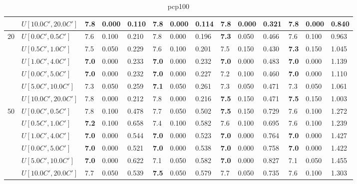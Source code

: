\begin{table}[h]
{\begin{tabular}{|l|l||l|l|l||l|l|l||l|l|l||l|l|l|}
       & $U[10.0C',20.0C']$ & \textbf{7.8} & 0.000 & 0.110 & \textbf{7.8} & 0.000 & 0.114 & \textbf{7.8} & 0.000 & 0.321 & \textbf{7.8} & 0.000 & 0.840 \\
      \hline\hline
      \multirow{6}{*}{20} & $U[0.0C',0.5C']$ & 7.6 & 0.100 & 0.210 & 7.8 & 0.000 & 0.196 & \textbf{7.3} & 0.050 & 0.466 & 7.6 & 0.100 & 0.963 \\
       & $U[0.5C',1.0C']$ & 7.5 & 0.050 & 0.229 & 7.6 & 0.100 & 0.201 & 7.5 & 0.150 & 0.430 & \textbf{7.3} & 0.150 & 1.045 \\
       & $U[1.0C',4.0C']$ & \textbf{7.0} & 0.000 & 0.233 & \textbf{7.0} & 0.000 & 0.232 & \textbf{7.0} & 0.000 & 0.483 & \textbf{7.0} & 0.000 & 1.139 \\
       & $U[0.0C',5.0C']$ & \textbf{7.0} & 0.000 & 0.232 & \textbf{7.0} & 0.000 & 0.227 & 7.2 & 0.100 & 0.460 & \textbf{7.0} & 0.000 & 1.110 \\
       & $U[5.0C',10.0C']$ & 7.3 & 0.050 & 0.259 & \textbf{7.1} & 0.050 & 0.261 & 7.3 & 0.050 & 0.471 & 7.3 & 0.050 & 1.061 \\
       & $U[10.0C',20.0C']$ & 7.8 & 0.000 & 0.212 & 7.8 & 0.000 & 0.216 & \textbf{7.5} & 0.150 & 0.471 & \textbf{7.5} & 0.150 & 1.003 \\
      \hline\hline
      \multirow{6}{*}{50} & $U[0.0C',0.5C']$ & 7.8 & 0.100 & 0.478 & 7.7 & 0.050 & 0.502 & \textbf{7.5} & 0.150 & 0.729 & 7.6 & 0.100 & 1.272 \\
       & $U[0.5C',1.0C']$ & \textbf{7.2} & 0.100 & 0.658 & 7.4 & 0.100 & 0.582 & 7.6 & 0.100 & 0.695 & 7.6 & 0.100 & 1.239 \\
       & $U[1.0C',4.0C']$ & \textbf{7.0} & 0.000 & 0.544 & \textbf{7.0} & 0.000 & 0.523 & \textbf{7.0} & 0.000 & 0.764 & \textbf{7.0} & 0.000 & 1.427 \\
       & $U[0.0C',5.0C']$ & \textbf{7.0} & 0.000 & 0.521 & \textbf{7.0} & 0.000 & 0.538 & \textbf{7.0} & 0.000 & 0.758 & \textbf{7.0} & 0.000 & 1.422 \\
       & $U[5.0C',10.0C']$ & \textbf{7.0} & 0.000 & 0.622 & 7.1 & 0.050 & 0.582 & \textbf{7.0} & 0.000 & 0.827 & 7.1 & 0.050 & 1.455 \\
       & $U[10.0C',20.0C']$ & 7.7 & 0.050 & 0.539 & \textbf{7.5} & 0.050 & 0.579 & 7.7 & 0.050 & 0.735 & 7.6 & 0.100 & 1.303 \\
      \hline
      \end{tabular}
      }
      \caption{pcp100}
      \label{tab:pcp100}\end{table}


